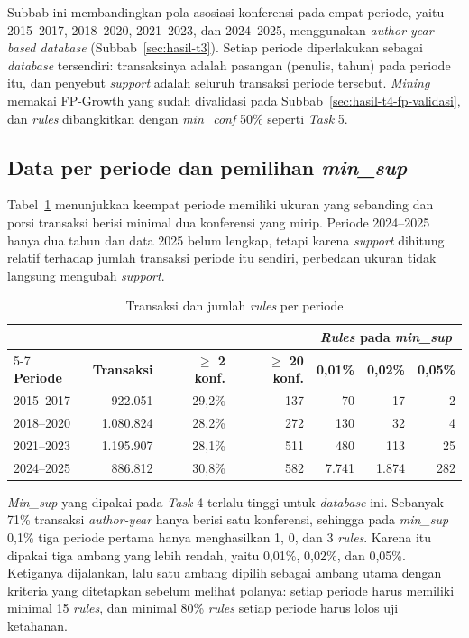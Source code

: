 Subbab ini membandingkan pola asosiasi konferensi pada empat periode, yaitu 2015--2017, 2018--2020, 2021--2023, dan 2024--2025, menggunakan \textit{author-year-based database} (Subbab~\ref{sec:hasil-t3}). Setiap periode diperlakukan sebagai \textit{database} tersendiri: transaksinya adalah pasangan (penulis, tahun) pada periode itu, dan penyebut \textit{support} adalah seluruh transaksi periode tersebut. \textit{Mining} memakai FP-Growth \cite{han2000} yang sudah divalidasi pada Subbab~\ref{sec:hasil-t4-fp-validasi}, dan \textit{rules} dibangkitkan dengan \textit{min\_conf} 50\% seperti \textit{Task} 5.

\subsection{Data per periode dan pemilihan \textit{min\_sup}}
\label{sec:hasil-e-data}
Tabel~\ref{tab:e-periode} menunjukkan keempat periode memiliki ukuran yang sebanding dan porsi transaksi berisi minimal dua konferensi yang mirip. Periode 2024--2025 hanya dua tahun dan data 2025 belum lengkap, tetapi karena \textit{support} dihitung relatif terhadap jumlah transaksi periode itu sendiri, perbedaan ukuran tidak langsung mengubah \textit{support}.

\begin{table}[ht]
\caption{Transaksi dan jumlah \textit{rules} per periode}
\label{tab:e-periode}
\small
\begin{tabular}{@{}lrrrrrr@{}}
\toprule
 & & & & \multicolumn{3}{c}{\textbf{\textit{Rules} pada \textit{min\_sup}}} \\
\cmidrule(lr){5-7}
\textbf{Periode} & \textbf{Transaksi} & \textbf{$\geq$ 2 konf.} & \textbf{$\geq$ 20 konf.} & \textbf{0,01\%} & \textbf{0,02\%} & \textbf{0,05\%} \\
\midrule
2015--2017 & 922.051 & 29,2\% & 137 & 70 & 17 & 2 \\
2018--2020 & 1.080.824 & 28,2\% & 272 & 130 & 32 & 4 \\
2021--2023 & 1.195.907 & 28,1\% & 511 & 480 & 113 & 25 \\
2024--2025 & 886.812 & 30,8\% & 582 & 7.741 & 1.874 & 282 \\
\bottomrule
\end{tabular}
\end{table}

\textit{Min\_sup} yang dipakai pada \textit{Task} 4 terlalu tinggi untuk \textit{database} ini. Sebanyak 71\% transaksi \textit{author-year} hanya berisi satu konferensi, sehingga pada \textit{min\_sup} 0,1\% tiga periode pertama hanya menghasilkan 1, 0, dan 3 \textit{rules}. Karena itu dipakai tiga ambang yang lebih rendah, yaitu 0,01\%, 0,02\%, dan 0,05\%. Ketiganya dijalankan, lalu satu ambang dipilih sebagai ambang utama dengan kriteria yang ditetapkan sebelum melihat polanya: setiap periode harus memiliki minimal 15 \textit{rules}, dan minimal 80\% \textit{rules} setiap periode harus lolos uji ketahanan.

